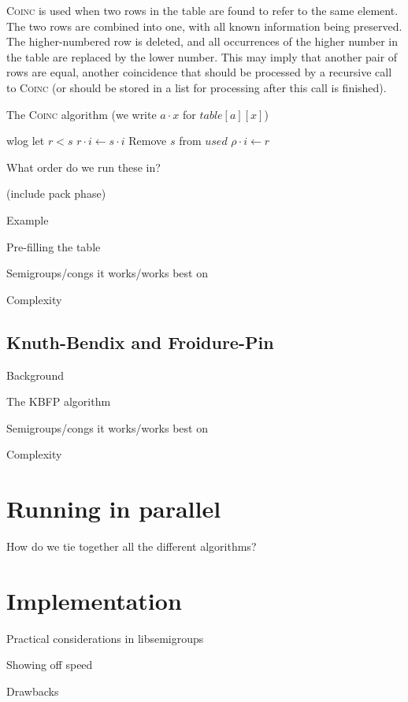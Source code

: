 \textsc{Coinc} is used when two rows in the table are found to refer to the same
element.  The two rows are combined into one, with all known information being
preserved.  The higher-numbered row is deleted, and all occurrences of the
higher number in the table are replaced by the lower number.  This may imply
that another pair of rows are equal, another coincidence that should be
processed by a recursive call to \textsc{Coinc} (or should be stored in a list
for processing after this call is finished).

\begin{algorithm}
\caption{The \textsc{Coinc} algorithm (we write $a \cdot x$ for $table[a][x]$)}
\begin{algorithmic}[1]
\State wlog let $r < s$
    \State $r \cdot i \gets s \cdot i$
    \State {}
  \EndIf
\EndFor
\State Remove $s$ from $used$
      \State $\rho \cdot i \gets r$
    \EndIf
  \EndFor
\EndFor
\EndProcedure
\end{algorithmic}
\end{algorithm}

What order do we run these in?

(include pack phase)

Example

Pre-filling the table

Semigroups/congs it works/works best on

Complexity

\subsection{Knuth-Bendix and Froidure-Pin}
\label{sec:kbfp}

Background

The KBFP algorithm

Semigroups/congs it works/works best on

Complexity

\section{Running in parallel}

How do we tie together all the different algorithms?

\section{Implementation}

Practical considerations in libsemigroups

Showing off speed

Drawbacks
